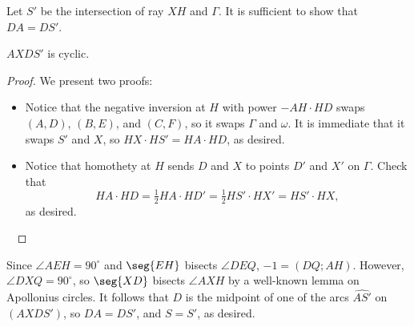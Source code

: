 Let $S'$ be the intersection of ray $XH$ and $\Gamma$. It is sufficient to show that $DA=DS'$.
\begin{iclaim*}
    $AXDS'$ is cyclic.
\end{iclaim*}
\begin{proof}
    We present two proofs:
    \begin{itemize}
        \item Notice that the negative inversion at $H$ with power $-AH\cdot HD$ swaps $(A,D)$, $(B,E)$, and $(C,F)$, so it swaps $\Gamma$ and $\omega$. It is immediate that it swaps $S'$ and $X$, so $HX\cdot HS'=HA\cdot HD$, as desired.
        \item Notice that homothety at $H$ sends $D$ and $X$ to points $D'$ and $X'$ on $\Gamma$. Check that \[HA\cdot HD=\tfrac12HA\cdot HD'=\tfrac12HS'\cdot HX'=HS'\cdot HX,\]
            as desired.
    \end{itemize}\
\end{proof}

Since $\angle AEH=90^\circ$ and $\seg{EH}$ bisects $\angle DEQ$, $-1=(DQ;AH)$. However, $\angle DXQ=90^\circ$, so $\seg{XD}$ bisects $\angle AXH$ by a well-known lemma on Apollonius circles. It follows that $D$ is the midpoint of one of the arcs $\widehat{AS'}$ on $(AXDS')$, so $DA=DS'$, and $S=S'$, as desired.
